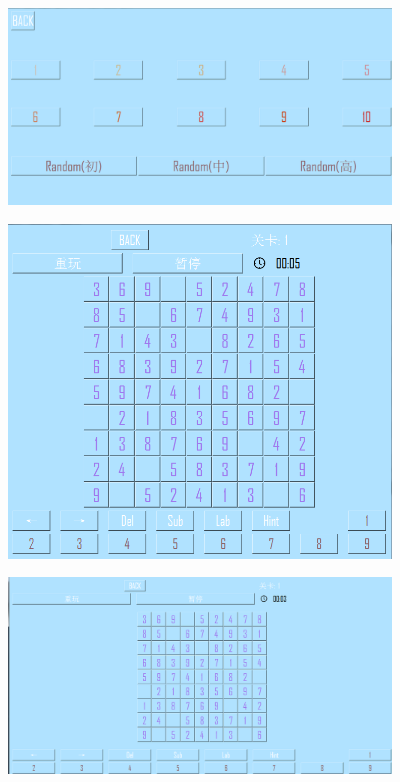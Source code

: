 \documentclass[hyperref,UTF8]{ctexart}
\begin{document}
\begin{center}
\includegraphics[width=4in]{sel.PNG}
\end{center}

\begin{center}
\includegraphics[width=4in]{game.PNG}
\end{center}

\begin{center}
\includegraphics[width=4in]{game1.PNG}
\end{center}
\end{document}
